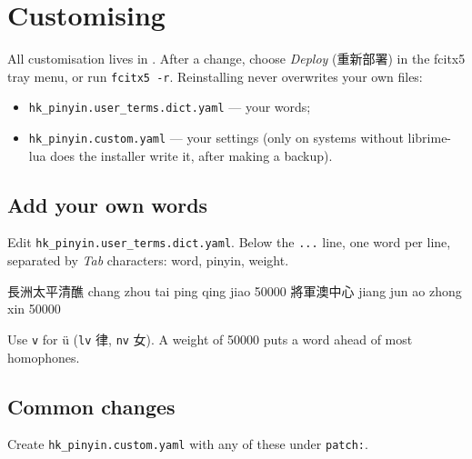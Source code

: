 \documentclass[11pt,a4paper]{article}
\newcommand{\code}[1]{\texttt{#1}}
\newenvironment{codeblock}{\begin{tcolorbox}[codebox]}{\end{tcolorbox}}
\begin{document}
\section{Customising}
All customisation lives in . After a change,
choose \emph{Deploy} (重新部署) in the fcitx5 tray menu, or run \code{fcitx5 -r}.
Reinstalling never overwrites your own files:
\begin{itemize}
  \item \code{hk\_pinyin.user\_terms.dict.yaml} — your words;
  \item \code{hk\_pinyin.custom.yaml} — your settings (only on systems without librime-lua does the installer write it, after making a backup).
\end{itemize}

\subsection{Add your own words}
Edit \code{hk\_pinyin.user\_terms.dict.yaml}. Below the \code{...} line, one word per line,
separated by \emph{Tab} characters: word, pinyin, weight.
\begin{codeblock}
\begin{shell}
長洲太平清醮	chang zhou tai ping qing jiao	50000
將軍澳中心	jiang jun ao zhong xin	50000
\end{shell}
\end{codeblock}
Use \code{v} for ü (\code{lv} 律, \code{nv} 女). A weight of 50000 puts a word ahead of most homophones.

\subsection{Common changes}
Create \code{hk\_pinyin.custom.yaml} with any of these under \code{patch:}.
\begin{codeblock}
\end{codeblock}
\end{document}
